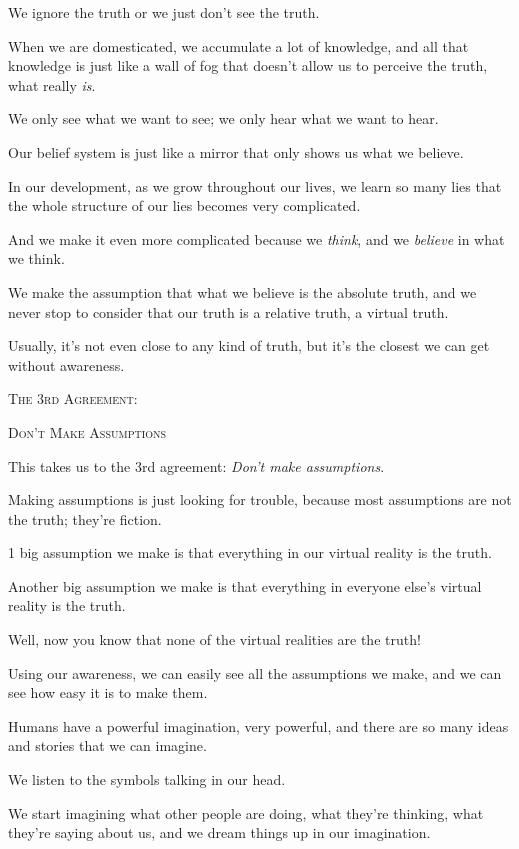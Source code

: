 \documentclass{article}
\numberwithin{equation}{section}
\begin{document}
We ignore the truth or we just don't see the truth.

When we are domesticated, we accumulate a lot of knowledge, and all that knowledge is just like a wall of fog that doesn't allow us to perceive the truth, what really \textit{is}.

We only see what we want to see; we only hear what we want to hear.

Our belief system is just like a mirror that only shows us what we believe.

%
In our development, as we grow throughout our lives, we learn so many lies that the whole structure of our lies becomes very complicated.

And we make it even more complicated because we \textit{think}, and we \textit{believe} in what we think.

We make the assumption that what we believe is the absolute truth, and we never stop to consider that our truth is a relative truth, a virtual truth.

Usually, it's not even close to any kind of truth, but it's the closest we can get without awareness.
\begin{center}
    \textsc{The 3rd Agreement:}
    
    \textsc{Don't Make Assumptions}
\end{center}

This takes us to the 3rd agreement: \textit{Don't make assumptions}.

Making assumptions is just looking for trouble, because most assumptions are not the truth; they're fiction.

1 big assumption we make is that everything in our virtual reality is the truth.

Another big assumption we make is that everything in everyone else's virtual reality is the truth.

Well, now you know that none of the virtual realities are the truth!

%
Using our awareness, we can easily see all the assumptions we make, and we can see how easy it is to make them.

Humans have a powerful imagination, very powerful, and there are so many ideas and stories that we can imagine.

We listen to the symbols talking in our head.

We start imagining what other people are doing, what they're thinking, what they're saying about us, and we dream things up in our imagination.
\end{document}
